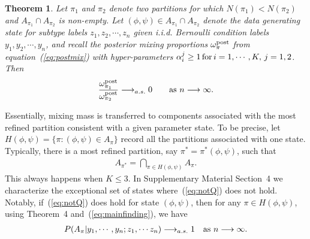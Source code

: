 \documentclass[aoas,preprint]{imsart}
\newtheorem{theorem}{Theorem}
\begin{document}
\begin{theorem}  Let $\pi_1$ and $\pi_2$ denote two partitions for which $N(\pi_1) < N(\pi_2)$
 and $A_{\pi_1} \cap A_{\pi_2}$ is non-empty. 
 Let $(\phi,\psi) \in A_{\pi_1} \cap A_{\pi_2}$ denote the data generating state for 
subtype labels $z_1, z_2, \cdots, z_n$ given i.i.d. Bernoulli condition labels $y_1, y_2, \cdots, y_n$, 
and recall the posterior mixing proportions $\omega^{\rm post}_\pi$ from equation~(\ref{eq:postmix}) with 
hyper-parameters $\alpha_i^j \geq 1 \, {\mbox {\rm for}} \,  i = 1, \cdots, K, \, j = 1,2$.   Then
\begin{eqnarray*}
\frac{\omega^{\rm post}_{\pi_1} }{ \omega^{\rm post}_{\pi_2} } \longrightarrow_{a.s.} 0 \qquad 
 {\mbox {\rm as $n \longrightarrow \infty$}}. 
\end{eqnarray*}
\end{theorem}
Essentially, mixing mass is transferred to components associated with the most refined partition
consistent with a given parameter state.  To be precise, let $H(\phi,\psi) = \{ \pi: (\phi,\psi) \in A_{\pi} \}$
record all the partitions associated with one state.   Typically, there is a most refined partition,
say $\pi^* = \pi^*(\phi,\psi)$, such that
\begin{eqnarray}
\label{eq:notQ}
A_{\pi^*} = \bigcap_{\pi \in H(\phi,\psi)} A_\pi.
\end{eqnarray}
This always happens when $K \leq 3$.  In Supplementary Material Section~4 we characterize 
the exceptional set of states where~(\ref{eq:notQ}) does not hold.  Notably, if~(\ref{eq:notQ}) does hold for
state $(\phi,\psi)$, then for any $\pi \in H(\phi,\psi)$, using Theorem~4 and~(\ref{eq:mainfinding}), we have
\begin{eqnarray*}
P(A_\pi|y_1,\cdots,y_n; z_1, \cdots z_n ) \longrightarrow_{a.s.} 1 \quad {\mbox {\rm as $n \longrightarrow \infty$}}.
\end{eqnarray*}
\end{document}
